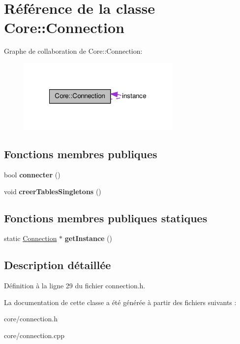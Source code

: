 \hypertarget{class_core_1_1_connection}{
\section{Référence de la classe Core::Connection}
\label{d9/de1/class_core_1_1_connection}
}


Graphe de collaboration de Core::Connection:\nopagebreak
\begin{figure}[H]
\begin{center}
\leavevmode
\includegraphics[width=227pt]{d3/d0c/class_core_1_1_connection__coll__graph}
\end{center}
\end{figure}
\subsection*{Fonctions membres publiques}
\begin{DoxyCompactItemize}
\item 
\hypertarget{class_core_1_1_connection_afdc9348dddce61b32603392b0184afd2}{
bool {\bfseries connecter} ()}
\label{d9/de1/class_core_1_1_connection_afdc9348dddce61b32603392b0184afd2}

\item 
\hypertarget{class_core_1_1_connection_a7c6a447d9dc62697749967243076c050}{
void {\bfseries creerTablesSingletons} ()}
\label{d9/de1/class_core_1_1_connection_a7c6a447d9dc62697749967243076c050}

\end{DoxyCompactItemize}
\subsection*{Fonctions membres publiques statiques}
\begin{DoxyCompactItemize}
\item 
\hypertarget{class_core_1_1_connection_ae13db59cd64ea83af1f344cfab170fd1}{
static \hyperlink{class_core_1_1_connection}{Connection} $\ast$ {\bfseries getInstance} ()}
\label{d9/de1/class_core_1_1_connection_ae13db59cd64ea83af1f344cfab170fd1}

\end{DoxyCompactItemize}


\subsection{Description détaillée}


Définition à la ligne 29 du fichier connection.h.



La documentation de cette classe a été générée à partir des fichiers suivants :\begin{DoxyCompactItemize}
\item 
core/connection.h\item 
core/connection.cpp\end{DoxyCompactItemize}
